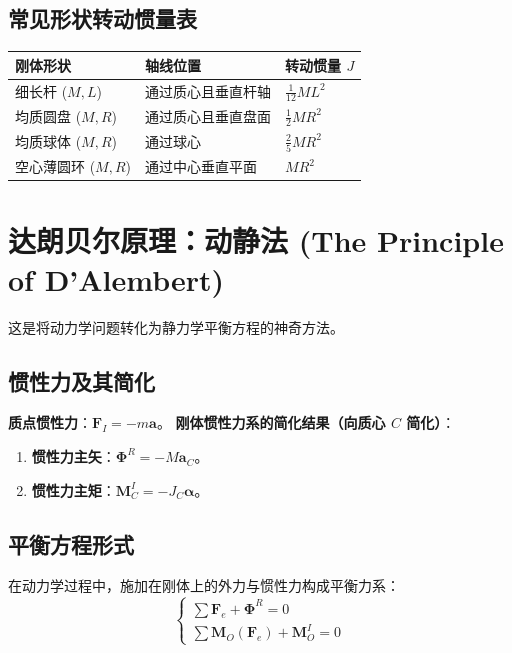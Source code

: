 \documentclass[12pt,a4paper]{article}
\newcommand{\vect}[1]{\mathbf{#1}}                   %
\begin{document}
\subsection{常见形状转动惯量表}
\begin{longtable}{lll}
    \toprule
    \textbf{刚体形状} & \textbf{轴线位置} & \textbf{转动惯量 $J$} \\ \midrule
    细长杆 ($M, L$) & 通过质心且垂直杆轴 & $\frac{1}{12}ML^2$ \\
    均质圆盘 ($M, R$) & 通过质心且垂直盘面 & $\frac{1}{2}MR^2$ \\
    均质球体 ($M, R$) & 通过球心 & $\frac{2}{5}MR^2$ \\
    空心薄圆环 ($M, R$) & 通过中心垂直平面 & $MR^2$ \\ \bottomrule
\end{longtable}

\section{达朗贝尔原理：动静法 (The Principle of D'Alembert)}

这是将动力学问题转化为静力学平衡方程的神奇方法。

\subsection{惯性力及其简化}
\textbf{质点惯性力}：$\vect{F}_I = -m \vect{a}$。
\textbf{刚体惯性力系的简化结果（向质心 $C$ 简化）}：
\begin{enumerate}
    \item \textbf{惯性力主矢}：$\vect{\Phi}^R = -M \vect{a}_C$。
    \item \textbf{惯性力主矩}：$\vect{M}_C^I = -J_C \vect{\alpha}$。
\end{enumerate}

\subsection{平衡方程形式}
在动力学过程中，施加在刚体上的外力与惯性力构成平衡力系：
\begin{equation}
    \begin{cases}
        \sum \vect{F}_e + \vect{\Phi}^R = 0 \\
        \sum \vect{M}_O(\vect{F}_e) + \vect{M}_O^I = 0
    \end{cases}
\end{equation}
\end{document}
